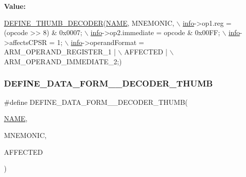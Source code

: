 {\bfseries Value\+:}
\begin{DoxyCode}
\mbox{\hyperlink{decoder-thumb_8c_a44d34ec3fd7c2c2ee51ff5966678c86e}{DEFINE\_THUMB\_DECODER}}(\mbox{\hyperlink{inflate_8h_a164ea0159d5f0b5f12a646f25f99eceaa67bc2ced260a8e43805d2480a785d312}{NAME}}, MNEMONIC, \(\backslash\)
        \mbox{\hyperlink{libretro_8h_structretro__game__info}{info}}->op1.reg = (opcode >> 8) & 0x0007; \(\backslash\)
        \mbox{\hyperlink{libretro_8h_structretro__game__info}{info}}->op2.immediate = opcode & 0x00FF; \(\backslash\)
        \mbox{\hyperlink{libretro_8h_structretro__game__info}{info}}->affectsCPSR = 1; \(\backslash\)
        \mbox{\hyperlink{libretro_8h_structretro__game__info}{info}}->operandFormat = ARM\_OPERAND\_REGISTER\_1 | \(\backslash\)
            AFFECTED | \(\backslash\)
            ARM\_OPERAND\_IMMEDIATE\_2;)
\end{DoxyCode}
\mbox{\label{decoder-thumb_8c_acd7668ae86478d08503b23da9f322bb6}} 
\subsubsection{\texorpdfstring{D\+E\+F\+I\+N\+E\+\_\+\+D\+A\+T\+A\+\_\+\+F\+O\+R\+M\+\_\+\_\+\+D\+E\+C\+O\+D\+E\+R\+\_\+\+T\+H\+U\+MB}{DEFINE\_DATA\_FORM\_5\_DECODER\_THUMB}}
{\footnotesize\ttfamily \#define D\+E\+F\+I\+N\+E\+\_\+\+D\+A\+T\+A\+\_\+\+F\+O\+R\+M\+\_\+\_\+\+D\+E\+C\+O\+D\+E\+R\+\_\+\+T\+H\+U\+MB(\begin{DoxyParamCaption}\item[{}]{\mbox{\hyperlink{inflate_8h_a164ea0159d5f0b5f12a646f25f99eceaa67bc2ced260a8e43805d2480a785d312}{N\+A\+ME}},  }\item[{}]{M\+N\+E\+M\+O\+N\+IC,  }\item[{}]{A\+F\+F\+E\+C\+T\+ED }\end{DoxyParamCaption})}


